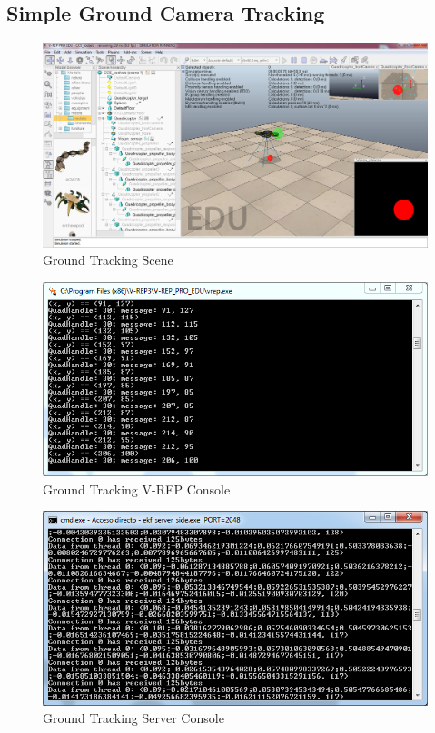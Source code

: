 \subsection{Simple Ground Camera Tracking}
\begin{figure}
	\includegraphics[width=\textwidth,natwidth=1366,natheight=728]{../Images/c3/ground_tracking_scene.png}
	\caption{Ground Tracking Scene}
	\label{fig:Ground_Tracking_Scene}
\end{figure}

\begin{figure}
	\includegraphics[width=\textwidth,natwidth=677,natheight=342]{../Images/c3/ground_tracking_vrep_console.png}
	\caption{Ground Tracking V-REP Console}
	\label{fig:Ground_Tracking_VREP_Console}
\end{figure}

\begin{figure}
	\includegraphics[width=\textwidth,natwidth=677,natheight=342]{../Images/c3/ground_tracking_server_console.png}
	\caption{Ground Tracking Server Console}
	\label{fig:Ground_Tracking_Server_Console}
\end{figure}


